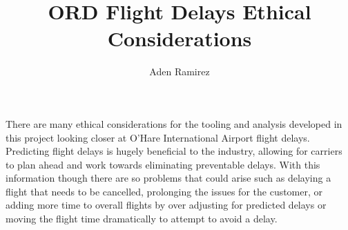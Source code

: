 \documentclass[a4paper,12pt]{article}
\begin{document}
\title{ORD Flight Delays Ethical Considerations}
\author{Aden Ramirez}
\maketitle

\pagebreak


There are many ethical considerations for the tooling and analysis developed in this project looking closer at O'Hare International Airport flight delays.
Predicting flight delays is hugely beneficial to the industry, allowing for carriers to plan ahead and work towards eliminating preventable delays.
With this information though there are so problems that could arise such as delaying a flight that needs to be cancelled, prolonging the issues for the customer,
or adding more time to overall flights by over adjusting for predicted delays or moving the flight time dramatically to attempt to avoid a delay.
\end{document}
